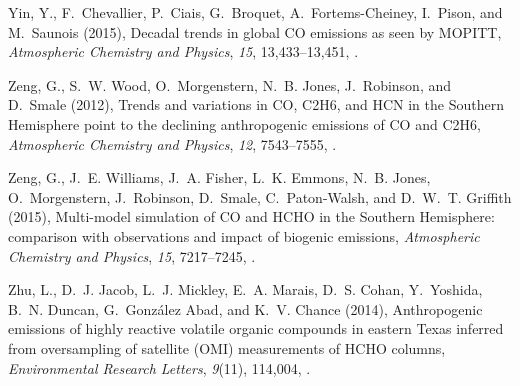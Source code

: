 \documentclass[draft,linenumbers]{AGUJournal}
\begin{document}
\begin{thebibliography}{51}
Yin, Y., F.~Chevallier, P.~Ciais, G.~Broquet, A.~Fortems-Cheiney, I.~Pison, and
  M.~Saunois (2015), {Decadal trends in global CO emissions as seen by MOPITT},
  \textit{Atmospheric Chemistry and Physics}, \textit{15}, 13,433--13,451,
  .

Zeng, G., S.~W. Wood, O.~Morgenstern, N.~B. Jones, J.~Robinson, and D.~Smale
  (2012), {Trends and variations in CO, C2H6, and HCN in the Southern
  Hemisphere point to the declining anthropogenic emissions of CO and C2H6},
  \textit{Atmospheric Chemistry and Physics}, \textit{12}, 7543--7555,
  .

Zeng, G., J.~E. Williams, J.~A. Fisher, L.~K. Emmons, N.~B. Jones,
  O.~Morgenstern, J.~Robinson, D.~Smale, C.~Paton-Walsh, and D.~W.~T. Griffith
  (2015), {Multi-model simulation of CO and HCHO in the Southern Hemisphere:
  comparison with observations and impact of biogenic emissions},
  \textit{Atmospheric Chemistry and Physics}, \textit{15}, 7217--7245,
  .

Zhu, L., D.~J. Jacob, L.~J. Mickley, E.~A. Marais, D.~S. Cohan, Y.~Yoshida,
  B.~N. Duncan, G.~{Gonz{\'{a}}lez Abad}, and K.~V. Chance (2014),
  {Anthropogenic emissions of highly reactive volatile organic compounds in
  eastern Texas inferred from oversampling of satellite (OMI) measurements of
  HCHO columns}, \textit{Environmental Research Letters}, \textit{9}(11),
  114,004, .

\end{thebibliography}





\listofchanges
\end{document}
